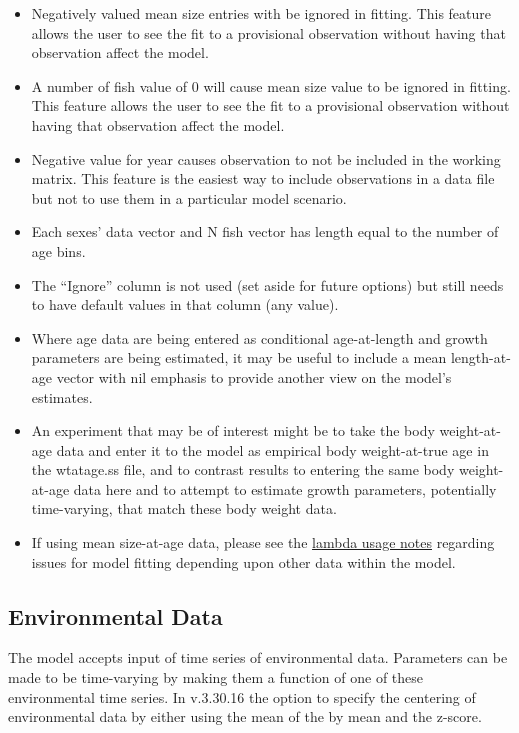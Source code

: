 	\begin{itemize}
		\item Negatively valued mean size entries with be ignored in fitting. This
		feature allows the user to see the fit to a provisional observation without having that
		observation affect the model.
		\item A number of fish value of 0 will cause mean size value to be ignored in fitting. This
		feature allows the user to see the fit to a provisional observation without having that
		observation affect the model.
		\item Negative value for year causes observation to not be included in the working matrix. This feature is the easiest way to include observations in a data file but not to use them in a
		particular model scenario.
		\item Each sexes' data vector and N fish vector has length equal to the number of age bins.
		\item The ``Ignore'' column is not used (set aside for future options) but still needs to have default values in that column (any value). 
		\item Where age data are being entered as conditional age-at-length and growth parameters are being estimated, it may be useful to include a mean length-at-age vector with nil emphasis to provide another view on the model's estimates.
		\item An experiment that may be of interest might be to take the body weight-at-age data and enter it to the model as empirical body weight-at-true age in the wtatage.ss file, and to contrast results to entering the same body weight-at-age data here and to attempt to estimate growth parameters, potentially time-varying, that match these body weight data.
		\item If using mean size-at-age data, please see the \hyperlink{SaAlambda}{lambda usage notes} regarding issues for model fitting depending upon other data within the model.  		
	\end{itemize}

\hypertarget{env-dat}{}
\subsection{Environmental Data}
The model accepts input of time series of environmental data.  Parameters can be made to be time-varying by making them a function of one of these environmental time series. In v.3.30.16 the option to specify the centering of environmental data by either using the mean of the by mean and the z-score. 

